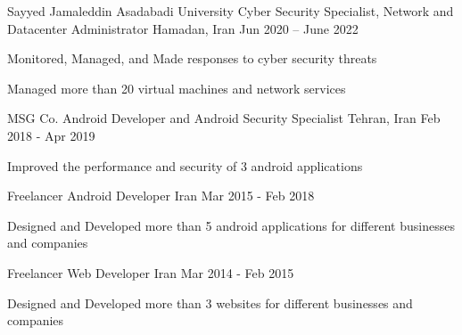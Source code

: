 

\begin{cventries}

    \cventry
        {Sayyed Jamaleddin Asadabadi University}
        {Cyber Security Specialist, Network and Datacenter Administrator}
        {Hamadan, Iran}
        {Jun 2020 – June 2022}
        {
            \begin{cvitems} 
                \item {Monitored, Managed, and Made responses to cyber security threats}
                \item {Managed more than 20 virtual machines and network services}
            \end{cvitems}
        }

    \cventry
        {MSG Co.}
        {Android Developer and Android Security Specialist}
        {Tehran, Iran}
        {Feb 2018 - Apr 2019}
        {
            \begin{cvitems} 
                \item {Improved the performance and security of 3 android applications}
            \end{cvitems}
        }

    \cventry
        {Freelancer} 
        {Android Developer}
        {Iran} 
        {Mar 2015 - Feb 2018} 
        {
            \begin{cvitems} 
                \item {Designed and Developed more than 5 android applications for different businesses and companies}
            \end{cvitems}
        }
    
    \cventry
        {Freelancer} 
        {Web Developer} 
        {Iran} 
        {Mar 2014 - Feb 2015} 
        {
            \begin{cvitems} 
                \item {Designed and Developed more than 3 websites for different businesses and companies} 
            \end{cvitems} 
        }
\end{cventries}